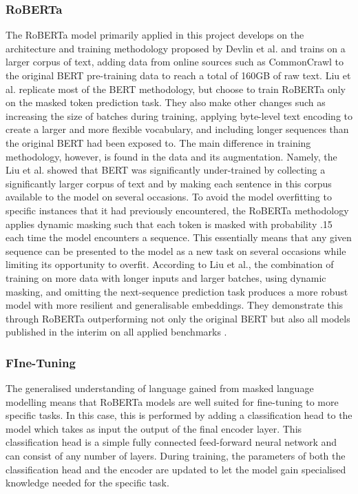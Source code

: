\documentclass[12pt]{report}
\begin{document}
\subsubsection*{RoBERTa}
The RoBERTa model primarily applied in this project develops on the architecture and training methodology proposed by Devlin et al. \cite{BERT} and trains on a larger corpus of text, adding data from online sources such as CommonCrawl to the original BERT pre-training data to reach a total of 160GB of raw text.
Liu et al. \cite{roberta} replicate most of the BERT methodology, but choose to train RoBERTa only on the masked token prediction task. They also make other changes such as increasing the size of batches during training, applying byte-level text encoding to create a larger and more flexible vocabulary, and including longer sequences than the original BERT had been exposed to.
The main difference in training methodology, however, is found in the data and its augmentation.
Namely, the Liu et al. showed that BERT was significantly under-trained by collecting a significantly larger corpus of text and by making each sentence in this corpus available to the model on several occasions.
To avoid the model overfitting to specific instances that it had previously encountered, the RoBERTa methodology applies dynamic masking such that each token is masked with probability .15 each time the model encounters a sequence.
This essentially means that any given sequence can be presented to the model as a new task on several occasions while limiting its opportunity to overfit.
According to Liu et al., the combination of training on more data with longer inputs and larger batches, using dynamic masking, and omitting the next-sequence prediction task produces a more robust model with more resilient and generalisable embeddings.
They demonstrate this through RoBERTa outperforming not only the original BERT but also all models published in the interim on all applied benchmarks \cite{roberta}.

\subsubsection*{FIne-Tuning}
The generalised understanding of language gained from masked language modelling means that RoBERTa models are well suited for fine-tuning to more specific tasks.
In this case, this is performed by adding a classification head to the model which takes as input the output of the final encoder layer. This classification head is a simple fully connected feed-forward neural network and can consist of any number of layers.
During training, the parameters of both the classification head and the encoder are updated to let the model gain specialised knowledge needed for the specific task.
\end{document}
